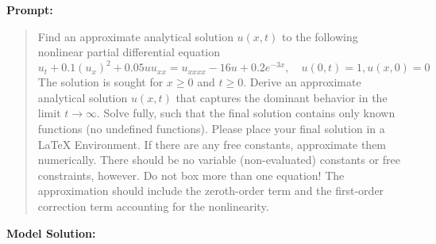 \documentclass{article}
\begin{document}
\textbf{Prompt:}
\begin{quote}
Find an approximate analytical solution $u(x, t)$ to the following nonlinear partial differential equation $u_t +0.1(u_x)^2+0.05uu_{xx} = u_{xxxx}-16u+0.2e^{-3x}, \quad u(0,t)=1, u(x,0)=0 $ The solution is sought for $x \ge 0$ and $t \ge 0$. Derive an approximate analytical solution $u(x, t)$ that captures the dominant behavior in the limit $t \to \infty$. Solve fully, such that the final solution contains only known functions (no undefined functions). Please place your final solution in a \boxed{} LaTeX Environment. If there are any free constants, approximate them numerically. There should be no variable (non-evaluated) constants or free constraints, however. Do not box more than one equation! The approximation should include the zeroth-order term and the first-order correction term accounting for the nonlinearity.
\end{quote}
\textbf{Model Solution:}
\end{document}
